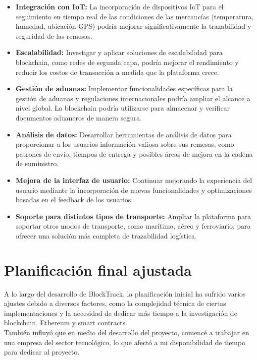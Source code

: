 \begin{itemize}
    \item \textbf{Integración con IoT:} La incorporación de dispositivos IoT para el seguimiento en tiempo real de las
    condiciones de las mercancías (temperatura, humedad, ubicación GPS) podría mejorar significativamente la trazabilidad y
    seguridad de las remesas.
    \item \textbf{Escalabilidad:} Investigar y aplicar soluciones de escalabilidad para blockchain, como redes de segunda capa,
    podría mejorar el rendimiento y reducir los costos de transacción a medida que la plataforma crece.
    \item \textbf{Gestión de aduanas:} Implementar funcionalidades específicas para la gestión de aduanas y regulaciones internacionales
   podría ampliar el alcance a nivel global. La blockchain podría utilizarse para almacenar y verificar documentos aduaneros de manera segura.
    \item \textbf{Análisis de datos:} Desarrollar herramientas de análisis de datos para proporcionar a los usuarios información
    valiosa sobre sus remesas, como patrones de envío, tiempos de entrega y posibles áreas de mejora en la cadena de suministro.
    \item \textbf{Mejora de la interfaz de usuario:} Continuar mejorando la experiencia del usuario mediante la incorporación
    de nuevas funcionalidades y optimizaciones basadas en el feedback de los usuarios.
    \item \textbf{Soporte para distintos tipos de transporte:} Ampliar la plataforma para soportar otros modos de transporte,
    como marítimo, aéreo y ferroviario, para ofrecer una solución más completa de trazabilidad logística.
\end{itemize}

\section{Planificación final ajustada}
A lo largo del desarrollo de BlockTrack, la planificación inicial ha sufrido varios ajustes debido a diversos factores,
como la complejidad técnica de ciertas implementaciones y la necesidad de dedicar más tiempo a la investigación de blockchain, Ethereum y smart contracts.\\

También influyó que en medio del desarrollo del proyecto, comencé a trabajar en una empresa del sector tecnológico, lo que
afectó a mi disponibilidad de tiempo para dedicar al proyecto. \\

